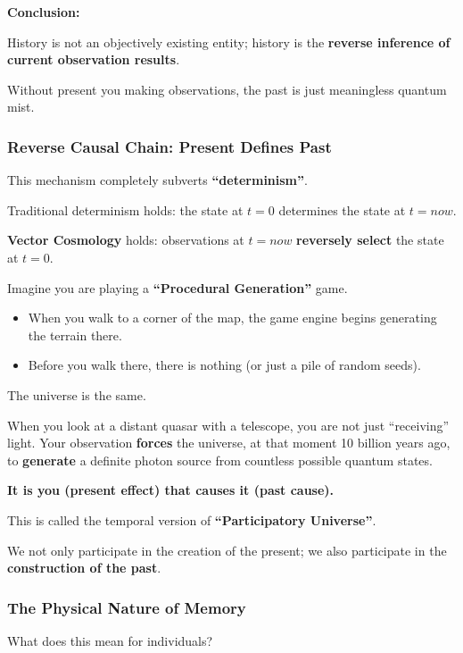 \textbf{Conclusion:}

History is not an objectively existing entity; history is the \textbf{reverse inference of current observation results}.

Without present you making observations, the past is just meaningless quantum mist.

\subsubsection{Reverse Causal Chain: Present Defines Past}

This mechanism completely subverts \textbf{``determinism''}.

Traditional determinism holds: the state at $t=0$ determines the state at $t=now$.

\textbf{Vector Cosmology} holds: observations at $t=now$ \textbf{reversely select} the state at $t=0$.

Imagine you are playing a \textbf{``Procedural Generation''} game.

\begin{itemize}
\item When you walk to a corner of the map, the game engine begins generating the terrain there.

\item Before you walk there, there is nothing (or just a pile of random seeds).
\end{itemize}

The universe is the same.

When you look at a distant quasar with a telescope, you are not just ``receiving'' light. Your observation \textbf{forces} the universe, at that moment 10 billion years ago, to \textbf{generate} a definite photon source from countless possible quantum states.

\textbf{It is you (present effect) that causes it (past cause).}

This is called the temporal version of \textbf{``Participatory Universe''}.

We not only participate in the creation of the present; we also participate in the \textbf{construction of the past}.

\subsubsection{The Physical Nature of Memory}

What does this mean for individuals?

